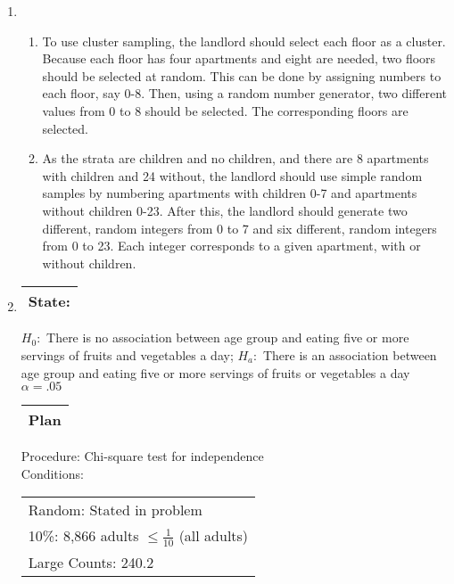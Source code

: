 \documentclass[12pt]{article}
\begin{document}
\begin{enumerate}
\begin{enumerate}
    \end{enumerate}

  \item

    \begin{enumerate}

      \item To use cluster sampling, the landlord should select each floor as a cluster. Because each floor has four apartments and eight are needed, two floors should be selected at random. This can be done by assigning numbers to each floor, say 0-8. Then, using a random number generator, two different values from 0 to 8 should be selected. The corresponding floors are selected.

      \item As the strata are children and no children, and there are 8 apartments with children and 24 without, the landlord should use simple random samples by numbering apartments with children 0-7 and apartments without children 0-23. After this, the landlord should generate two different, random integers from 0 to 7 and six different, random integers from 0 to 23. Each integer corresponds to a given apartment, with or without children.

    \end{enumerate}

  \item

    \begin{tabular}{|c|}
    \hline
    \textbf{State:}\\
    \hline
    \end{tabular}

    $H_0:$ There is no association between age group and eating five or more servings of fruits and vegetables a day; $H_a:$ There is an association between age group and eating five or more servings of fruits or vegetables a day\\
    $\alpha = .05$

    \begin{tabular}{|c|}
    \hline
    \textbf{Plan}\\
    \hline
    \end{tabular}

    Procedure: Chi-square test for independence\\
    Conditions: \begin{tabular}{l}Random: Stated in problem\\ 10\%: 8,866 adults $\leq\frac{1}{10}$ (all adults)\\ Large Counts: 240.2 \geq 5 \end{tabular}


\end{enumerate}
\end{document}
